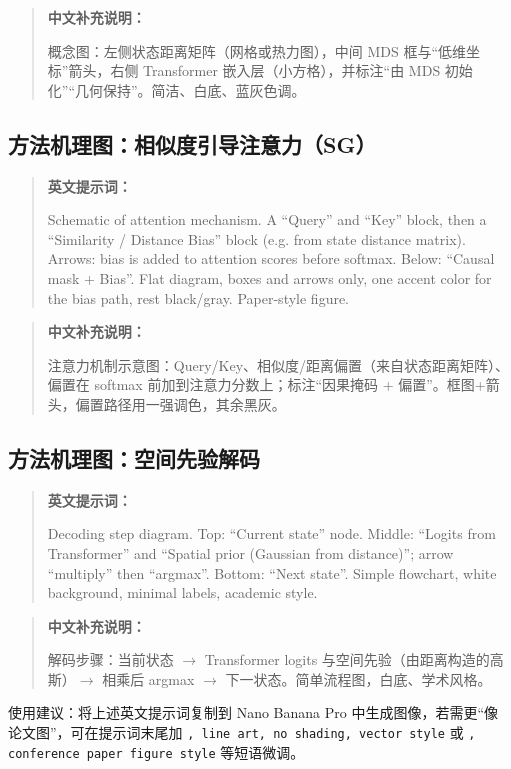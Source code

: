 \documentclass[UTF8,11pt]{ctexart}
\begin{document}
\begin{quote}
\textbf{中文补充说明：}

概念图：左侧状态距离矩阵（网格或热力图），中间 MDS 框与“低维坐标”箭头，右侧 Transformer 嵌入层（小方格），并标注“由 MDS 初始化”“几何保持”。简洁、白底、蓝灰色调。
\end{quote}

\subsection{方法机理图：相似度引导注意力（SG）}
\begin{quote}
\textbf{英文提示词：}

Schematic of attention mechanism. A ``Query'' and ``Key'' block, then a ``Similarity / Distance Bias'' block (e.g. from state distance matrix). Arrows: bias is added to attention scores before softmax. Below: ``Causal mask + Bias''. Flat diagram, boxes and arrows only, one accent color for the bias path, rest black/gray. Paper-style figure.
\end{quote}

\begin{quote}
\textbf{中文补充说明：}

注意力机制示意图：Query/Key、相似度/距离偏置（来自状态距离矩阵）、偏置在 softmax 前加到注意力分数上；标注“因果掩码 + 偏置”。框图+箭头，偏置路径用一强调色，其余黑灰。
\end{quote}

\subsection{方法机理图：空间先验解码}
\begin{quote}
\textbf{英文提示词：}

Decoding step diagram. Top: ``Current state'' node. Middle: ``Logits from Transformer'' and ``Spatial prior (Gaussian from distance)''; arrow ``multiply'' then ``argmax''. Bottom: ``Next state''. Simple flowchart, white background, minimal labels, academic style.
\end{quote}

\begin{quote}
\textbf{中文补充说明：}

解码步骤：当前状态 $\to$ Transformer logits 与空间先验（由距离构造的高斯）$\to$ 相乘后 argmax $\to$ 下一状态。简单流程图，白底、学术风格。
\end{quote}

\vspace{1em}
\noindent 使用建议：将上述英文提示词复制到 Nano Banana Pro 中生成图像，若需更“像论文图”，可在提示词末尾加 \texttt{, line art, no shading, vector style} 或 \texttt{, conference paper figure style} 等短语微调。
\end{document}
